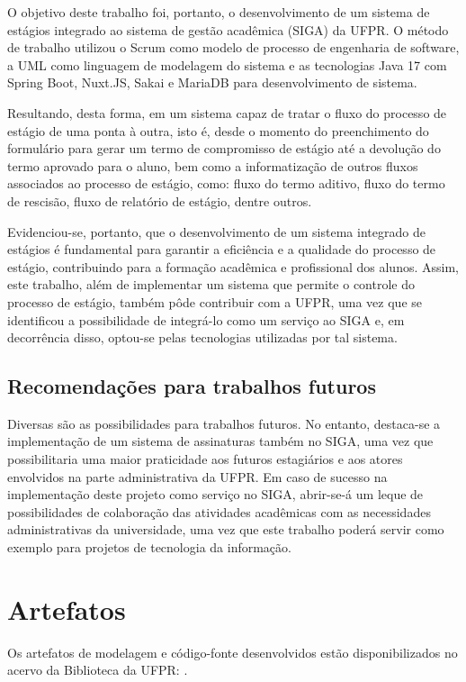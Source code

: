 \documentclass[conference,a4paper,10pt]{IEEETran}
\begin{document}
O objetivo deste trabalho foi, portanto, o desenvolvimento de um sistema de estágios integrado ao sistema de gestão acadêmica (SIGA) da UFPR. O método de trabalho utilizou o Scrum como modelo de processo de engenharia de software, a UML como linguagem de modelagem do sistema e as tecnologias Java 17 com Spring Boot, Nuxt.JS, Sakai e MariaDB para desenvolvimento de sistema.

Resultando, desta forma, em um sistema capaz de tratar o fluxo do processo de estágio de uma ponta à outra, isto é, desde o momento do preenchimento do formulário para gerar um termo de compromisso de estágio até a devolução do termo aprovado para o aluno, bem como a informatização de outros fluxos associados ao processo de estágio, como: fluxo do termo aditivo, fluxo do termo de rescisão, fluxo de relatório de estágio, dentre outros.
 
Evidenciou-se, portanto, que o desenvolvimento de um sistema integrado de estágios é fundamental para garantir a eficiência e a qualidade do processo de estágio, contribuindo para a formação acadêmica e profissional dos alunos. Assim,
este trabalho, além de implementar um sistema que permite o controle do processo de estágio, também pôde contribuir com a UFPR, uma vez que se identificou a possibilidade de integrá-lo como um serviço ao SIGA e, em decorrência disso,
optou-se pelas tecnologias utilizadas por tal sistema.

\subsection{Recomendações para trabalhos futuros} 
Diversas são as possibilidades para trabalhos futuros. No entanto, destaca-se a implementação de um sistema de assinaturas também no SIGA, uma vez que possibilitaria uma maior praticidade aos futuros estagiários e aos atores envolvidos na
parte administrativa da UFPR. Em caso de sucesso na implementação deste projeto como serviço no SIGA, abrir-se-á um leque de possibilidades de colaboração das atividades acadêmicas com as necessidades administrativas da universidade, uma vez que este trabalho poderá servir como exemplo para projetos de tecnologia da informação.


\section{Artefatos}

Os artefatos de modelagem e código-fonte desenvolvidos estão disponibilizados no acervo da Biblioteca da UFPR: \texttt{\repositorio}.



\def\refname{Referências}



\end{document}
